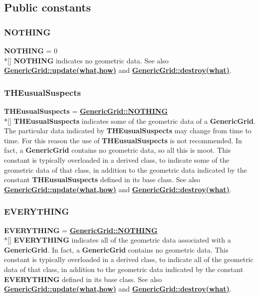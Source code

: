 \documentclass{article}
\begin{document}
\subsection{Public constants}
\label{GenericGrid::PublicConstants}

  \subsubsection{NOTHING}
  \label{GenericGrid::NOTHING}
    \textbf{NOTHING} = 0 \\*[\parskip]
    \textbf{NOTHING} indicates no geometric data.
    See also {\bf{}\hyperref{update(what,how)}{update(what,how) \rm(\S}{)}{GenericGrid::update(what,how)}}
    and {\bf{}\hyperref{destroy(what)}{destroy(what) \rm(\S}{)}{GenericGrid::destroy(what)}}.

  \subsubsection{THEusualSuspects}
  \label{GenericGrid::THEusualSuspects}
    \textbf{THEusualSuspects} = {\bf{}\hyperref{NOTHING}{NOTHING \rm(\S}{)}{GenericGrid::NOTHING}} \\*[\parskip]
    \textbf{THEusualSuspects} indicates some of the geometric data of a \textbf{GenericGrid}.
    The particular data indicated by \textbf{THEusualSuspects} may change from time to time.
    For this reason the use of \textbf{THEusualSuspects} is not recommended.
    In fact, a \textbf{GenericGrid} contains no geometric data, so all this is moot.
    This constant is typically overloaded in a derived class, to indicate some of the
    geometric data of that class, in addition to the geometric data indicated by
    the constant \textbf{THEusualSuspects} defined in its base class.
    See also {\bf{}\hyperref{update(what,how)}{update(what,how) \rm(\S}{)}{GenericGrid::update(what,how)}}
    and {\bf{}\hyperref{destroy(what)}{destroy(what) \rm(\S}{)}{GenericGrid::destroy(what)}}.

  \subsubsection{EVERYTHING}
  \label{GenericGrid::EVERYTHING}
    \textbf{EVERYTHING} = {\bf{}\hyperref{NOTHING}{NOTHING \rm(\S}{)}{GenericGrid::NOTHING}} \\*[\parskip]
    \textbf{EVERYTHING} indicates all of the geometric data associated with a \textbf{GenericGrid}.
    In fact, a \textbf{GenericGrid} contains no geometric data.
    This constant is typically overloaded in a derived class, to indicate all of the
    geometric data of that class, in addition to the geometric data indicated by
    the constant \textbf{EVERYTHING} defined in its base class.
    See also {\bf{}\hyperref{update(what,how)}{update(what,how) \rm(\S}{)}{GenericGrid::update(what,how)}}
    and {\bf{}\hyperref{destroy(what)}{destroy(what) \rm(\S}{)}{GenericGrid::destroy(what)}}.
\end{document}
